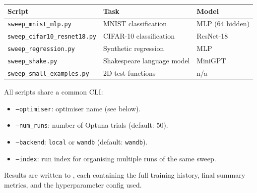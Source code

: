 \documentclass{article}
\begin{document}
\begin{appendices}
\begin{center}
\small
\begin{tabular}{lll}
    \toprule
    \textbf{Script} & \textbf{Task} & \textbf{Model} \\
    \midrule
    \texttt{sweep\_mnist\_mlp.py}       & MNIST classification        & MLP (64 hidden) \\
    \texttt{sweep\_cifar10\_resnet18.py} & CIFAR-10 classification     & ResNet-18 \\
    \texttt{sweep\_regression.py}        & Synthetic regression        & MLP \\
    \texttt{sweep\_shake.py}             & Shakespeare language model  & MiniGPT \\
    \texttt{sweep\_small\_examples.py}   & 2D test functions           & n/a \\
    \bottomrule
\end{tabular}
\end{center}

All scripts share a common CLI:
\begin{itemize}
    \item \texttt{--optimiser}: optimiser name (see below).
    \item \texttt{--num\_runs}: number of Optuna trials (default: 50).
    \item \texttt{--backend}: \texttt{local} or \texttt{wandb} (default: \texttt{wandb}).
    \item \texttt{--index}: run index for organising multiple runs of the same sweep.
\end{itemize}
\begin{sloppypar}
Results are written to ,
each containing the full training history, final summary metrics, and the hyperparameter config used.
\end{sloppypar}


\end{appendices}
\end{document}

